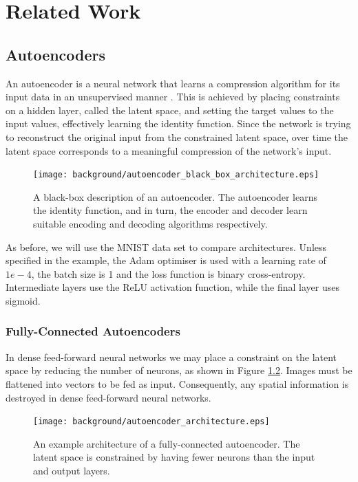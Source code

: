 \chapter{Related Work}

\label{ch:related_work}

%
%
%
%
%
\section{Autoencoders}

An autoencoder is a neural network that learns a compression algorithm for its input data in an unsupervised manner \cite{Liou2008}. This is achieved by placing constraints on a hidden layer, called the latent space, and setting the target values to the input values, effectively learning the identity function. Since the network is trying to reconstruct the original input from the constrained latent space, over time the latent space corresponds to a meaningful compression of the network's input.

\begin{figure}[h!]
\centering
\captionsetup{justification=centering}
\texttt{[image: background/autoencoder\_black\_box\_architecture.eps]}
\caption{A black-box description of an autoencoder. The autoencoder learns the identity function, and in turn, the encoder and decoder learn suitable encoding and decoding algorithms respectively.}
\label{fig:autoencoder_black_box_architecture}
\end{figure}

As before, we will use the MNIST data set to compare architectures. Unless specified in the example, the Adam optimiser is used with a learning rate of $1e-4$, the batch size is 1 and the loss function is binary cross-entropy. Intermediate layers use the ReLU activation function, while the final layer uses sigmoid.

\subsection{Fully-Connected Autoencoders}

In dense feed-forward neural networks we may place a constraint on the latent space by reducing the number of neurons, as shown in Figure \ref{fig:autoencoder_architecture}. Images must be flattened into vectors to be fed as input. Consequently, any spatial information is destroyed in dense feed-forward neural networks.

\begin{figure}[h!]
\centering
\captionsetup{justification=centering}
\texttt{[image: background/autoencoder\_architecture.eps]}
\caption{An example architecture of a fully-connected autoencoder. The latent space is constrained by having fewer neurons than the input and output layers.}
\label{fig:autoencoder_architecture}
\end{figure}

